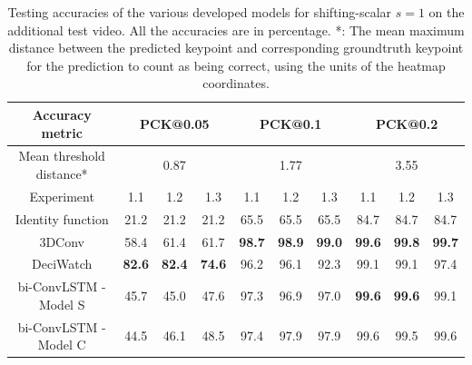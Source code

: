 \documentclass[./main.tex]{subfiles}
\begin{document}
\begin{table}[htbp]
    \begin{tabular}{c||ccc|ccc|ccc}
        \hline
        Accuracy metric & \multicolumn{3}{c}{PCK@0.05} & \multicolumn{3}{c}{PCK@0.1} & \multicolumn{3}{c}{PCK@0.2} \\
        \hline
        Mean threshold distance* & \multicolumn{3}{c}{0.87} & \multicolumn{3}{c}{1.77} & \multicolumn{3}{c}{3.55} \\
        \hline
        Experiment & 1.1 & 1.2 & 1.3 & 1.1 & 1.2 & 1.3 & 1.1 & 1.2 & 1.3 \\
        \hline
        \hline
        Identity function & 21.2 & 21.2 & 21.2 & 65.5 & 65.5 & 65.5 & 84.7 & 84.7 & 84.7 \\
        3DConv & 58.4 & 61.4 & 61.7 & \textbf{98.7} & \textbf{98.9} & \textbf{99.0} & \textbf{99.6} & \textbf{99.8} & \textbf{99.7} \\
        DeciWatch & \textbf{82.6} & \textbf{82.4} & \textbf{74.6} & 96.2 & 96.1 & 92.3 & 99.1 & 99.1 & 97.4 \\
        bi-ConvLSTM - Model S & 45.7 & 45.0 & 47.6 & 97.3 & 96.9 & 97.0 & \textbf{99.6} & \textbf{99.6} & 99.1 \\
        bi-ConvLSTM - Model C & 44.5 & 46.1 & 48.5 & 97.4 & 97.9 & 97.9 & 99.6 & 99.5 & 99.6 \\
        \hline
    \end{tabular}
    \caption{Testing accuracies of the various developed models for shifting-scalar $s = 1$ on the additional test video. All the accuracies are in percentage. *: The mean maximum distance between the predicted keypoint and corresponding groundtruth keypoint for the prediction to count as being correct, using the units of the heatmap coordinates.}
    \label{tab:finetune_test_accs_3}
\end{table}
\end{document}
